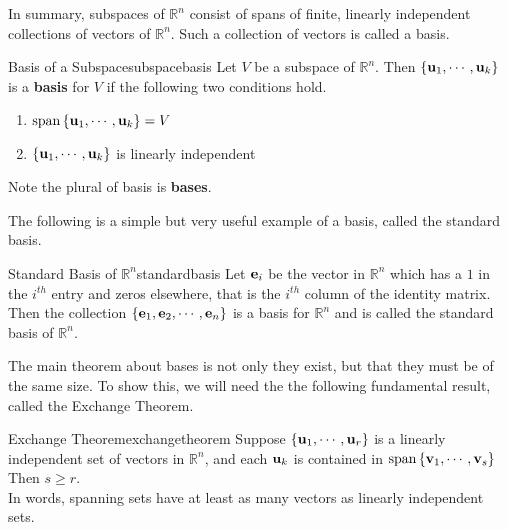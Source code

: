 In summary, subspaces of $\mathbb{R}^{n}$ consist of spans of finite,
linearly independent collections of vectors of $\mathbb{R}^{n}$.  Such
a collection of vectors is called a basis.

\begin{definition}{Basis of a Subspace}{subspacebasis}
Let $V$ be a subspace of $\mathbb{R}^{n}$. Then $\left\{
{\bf u}_{1},\cdots ,{\bf u}_{k}\right\} $ is a \textbf{basis} for $V$ if the following two conditions hold.

\begin{enumerate}
\item $\mbox{span}\left\{ {\bf u}_{1},\cdots ,{\bf u}_{k}\right\} =V$
\item $\left\{ {\bf u}_{1},\cdots ,{\bf u}_{k}\right\} $ is linearly
independent
\end{enumerate}

Note the plural of basis is \textbf{bases}. 
\end{definition}

The following is a simple but very useful example of a basis, called the standard basis.

\begin{definition}{Standard Basis of $\mathbb{R}^n$}{standardbasis}
Let ${\bf e}_i$ be the vector in $\mathbb{R}^n$ which has a $1$ in the $i^{th}$ entry and zeros elsewhere, that is the $i^{th}$ column of the identity matrix. Then the collection $\left\{{\bf e}_1, {\bf e}_2, \cdots, {\bf e}_n
\right\}$ is a basis for
$\mathbb{R}^n$ and is called the standard basis of $\mathbb{R}^n$.
\end{definition}

The main theorem about bases is not only they exist, but that they
must be of the same size. To show this, we will need the the following
fundamental result, called the Exchange Theorem.

\begin{theorem}{Exchange Theorem}{exchangetheorem}
Suppose $\left\{ {\bf u}_{1},\cdots ,{\bf u}_{r}\right\} $ is a
linearly independent set of vectors in $\mathbb{R}^n$, and each
${\bf u}_{k}$ is contained in $\mbox{span}\left\{ {\bf v}_{1},\cdots
,{\bf v}_{s}\right\}$ Then $s\geq r.$ \\
In words, spanning sets have at least as many vectors as linearly
independent sets.
\end{theorem}

